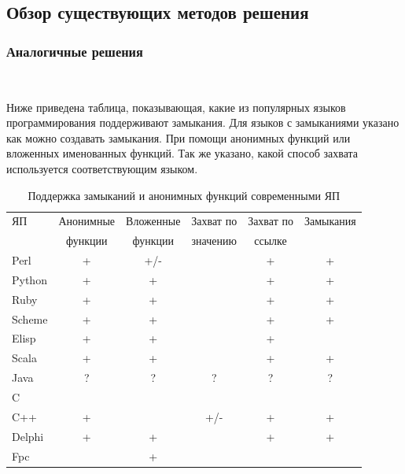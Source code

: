 \documentclass{imcs}
\begin{document}
\subsection{Обзор существующих методов решения}

\subsubsection{Аналогичные решения}

~~~

Ниже приведена таблица, показывающая, какие из популярных языков программирования поддерживают
замыкания. Для языков с замыканиями указано как можно создавать замыкания. При помощи анонимных
функций или вложенных именованных функций. Так же указано, какой способ захвата используется
соответствующим языком.

\begin{table}[h!]
\begin{center}
\begin{tabular}{|l|c|c|c|c|c|}
\hline
  ЯП     &  Анонимные  &  Вложенные  &  Захват по  &  Захват по  &  Замыкания  \\
         &  функции    &  функции    &  значению   &  ссылке     &             \\
\hline
 Perl    &  +          &  +/-        &             &  +          &  +          \\
\hline
 Python  &  +          &  +          &             &  +          &  +          \\
\hline
 Ruby    &  +          &  +          &             &  +          &  +          \\
\hline
 Scheme  &  +          &  +          &             &  +          &  +          \\
\hline
 Elisp   &  +          &  +          &             &  +          &             \\
\hline
 Scala   &  +          &  +          &             &  +          &  +          \\
\hline
 Java    &  ?          &  ?          &  ?          &  ?          &  ?          \\
\hline
 C       &             &             &             &             &             \\
\hline
 C++     &  +          &             &  +/-        &  +          &  +          \\
\hline
 Delphi  &  +          &  +          &             &  +          &  +          \\
\hline
 Fpc     &             &  +          &             &             &             \\
\hline
\end{tabular}
\caption{Поддержка замыканий и анонимных функций современными ЯП}\label{tab:wsi_diff_rel}
\end{center}
\end{table}
\end{document}
